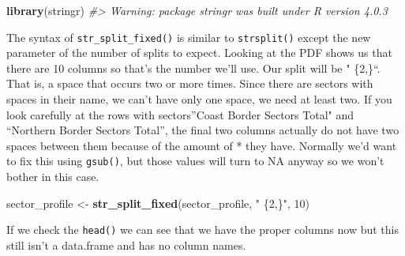 \documentclass[
  12pt,
]{book}
\newenvironment{Shaded}{\begin{snugshade}}{\end{snugshade}}
\newcommand{\CommentTok}[1]{\textcolor[rgb]{0.37,0.37,0.37}{\textit{#1}}}
\newcommand{\DecValTok}[1]{\textcolor[rgb]{0.06,0.06,0.06}{#1}}
\newcommand{\KeywordTok}[1]{\textcolor[rgb]{0.27,0.27,0.27}{\textbf{#1}}}
\newcommand{\NormalTok}[1]{#1}
\newcommand{\StringTok}[1]{\textcolor[rgb]{0.5,0.5,0.5}{#1}}
\begin{document}
\begin{Shaded}
\begin{Highlighting}[]
\KeywordTok{library}\NormalTok{(stringr)}
\CommentTok{\#\textgreater{} Warning: package \textquotesingle{}stringr\textquotesingle{} was built under R version 4.0.3}
\end{Highlighting}
\end{Shaded}

The syntax of \texttt{str\_split\_fixed()} is similar to \texttt{strsplit()} except the new parameter of the number of splits to expect. Looking at the PDF shows us that there are 10 columns so that's the number we'll use. Our split will be " \{2,\}``. That is, a space that occurs two or more times. Since there are sectors with spaces in their name, we can't have only one space, we need at least two. If you look carefully at the rows with sectors''Coast Border Sectors Total" and ``Northern Border Sectors Total'', the final two columns actually do not have two spaces between them because of the amount of * they have. Normally we'd want to fix this using \texttt{gsub()}, but those values will turn to NA anyway so we won't bother in this case.

\begin{Shaded}
\begin{Highlighting}[]
\NormalTok{sector\_profile \textless{}{-}}\StringTok{ }\KeywordTok{str\_split\_fixed}\NormalTok{(sector\_profile, }\StringTok{" \{2,\}"}\NormalTok{, }\DecValTok{10}\NormalTok{)}
\end{Highlighting}
\end{Shaded}

If we check the \texttt{head()} we can see that we have the proper columns now but this still isn't a data.frame and has no column names.
\end{document}
